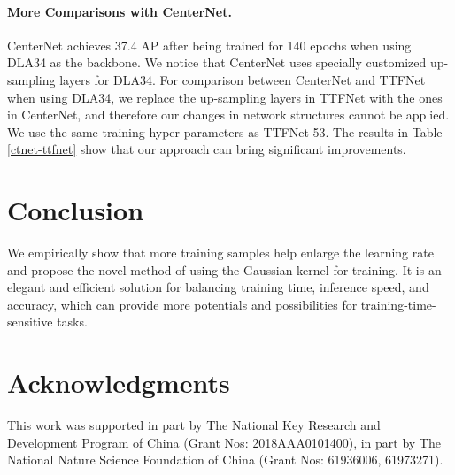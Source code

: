 \documentclass[letterpaper]{article} \usepackage{aaai20}  \usepackage{times}  \usepackage{helvet} \usepackage{courier}  \usepackage[hyphens]{url}  \usepackage{graphicx} \urlstyle{rm} \def\UrlFont{\rm}  \usepackage{graphicx}  \frenchspacing  \setlength{\pdfpagewidth}{8.5in}  \setlength{\pdfpageheight}{11in}  \usepackage{subcaption}
\begin{document}
\paragraph{More Comparisons with CenterNet.} CenterNet achieves 37.4 AP after being trained for 140 epochs when using DLA34 as the backbone. We notice that CenterNet uses specially customized up-sampling layers for DLA34. For comparison between CenterNet and TTFNet when using DLA34, we replace the up-sampling layers in TTFNet with the ones in CenterNet, and therefore our changes in network structures cannot be applied. We use the same training hyper-parameters as TTFNet-53. The results in Table \ref{ctnet-ttfnet} show that our approach can bring significant improvements.

\section{Conclusion}

We empirically show that more training samples help enlarge the learning rate and propose the novel method of using the Gaussian kernel for training. It is an elegant and efficient solution for balancing training time, inference speed, and accuracy, which can provide more potentials and possibilities for training-time-sensitive tasks\cite{DBLP:conf/iclr/ZophL17,DBLP:conf/cvpr/ZophVSL18,ghiasi2019fpn,DBLP:journals/corr/abs-1906-04423,gao2019nddr}.

\section*{Acknowledgments}

This work was supported in part by The National Key Research and Development Program of China (Grant Nos: 2018AAA0101400), in part by The National Nature Science Foundation of China (Grant Nos: 61936006, 61973271).


\small 

\end{document}
